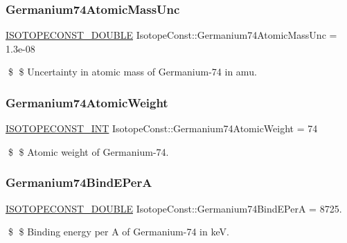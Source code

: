 \subsubsection{\texorpdfstring{Germanium74\+Atomic\+Mass\+Unc}{Germanium74AtomicMassUnc}}
{\footnotesize\ttfamily \mbox{\hyperlink{group___isotope_const-_macros_ga8f45a7272ce02c0b4c65c44636ed719a}{I\+S\+O\+T\+O\+P\+E\+C\+O\+N\+S\+T\+\_\+\+D\+O\+U\+B\+LE}} Isotope\+Const\+::\+Germanium74\+Atomic\+Mass\+Unc = 1.\+3e-\/08}

\$ \$ Uncertainty in atomic mass of Germanium-\/74 in amu. \mbox{\label{group___isotope_const-_germanium-_ge74_ga961e2e28629100b06dd60bfbf380684c}} 
\subsubsection{\texorpdfstring{Germanium74\+Atomic\+Weight}{Germanium74AtomicWeight}}
{\footnotesize\ttfamily \mbox{\hyperlink{group___isotope_const-_macros_ga5f18360b3e99483a35c32d789e62621c}{I\+S\+O\+T\+O\+P\+E\+C\+O\+N\+S\+T\+\_\+\+I\+NT}} Isotope\+Const\+::\+Germanium74\+Atomic\+Weight = 74}

\$ \$ Atomic weight of Germanium-\/74. \mbox{\label{group___isotope_const-_germanium-_ge74_gac9205890176c9a58fd61f97c5cf90761}} 
\subsubsection{\texorpdfstring{Germanium74\+Bind\+E\+PerA}{Germanium74BindEPerA}}
{\footnotesize\ttfamily \mbox{\hyperlink{group___isotope_const-_macros_ga8f45a7272ce02c0b4c65c44636ed719a}{I\+S\+O\+T\+O\+P\+E\+C\+O\+N\+S\+T\+\_\+\+D\+O\+U\+B\+LE}} Isotope\+Const\+::\+Germanium74\+Bind\+E\+PerA = 8725.}

\$ \$ Binding energy per A of Germanium-\/74 in keV. \mbox{\label{group___isotope_const-_germanium-_ge74_gaa670380e4df8790424ee871ae61c501e}} 
